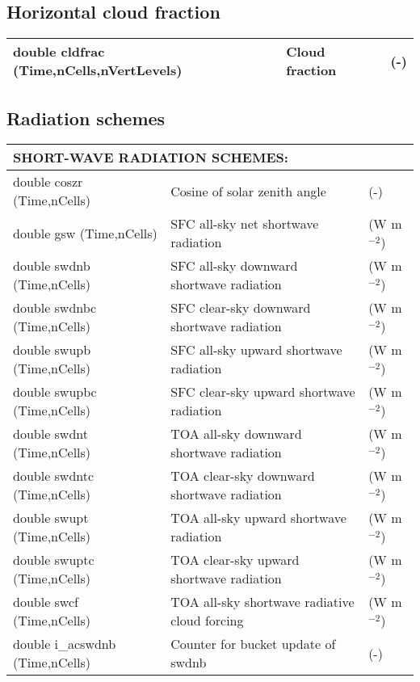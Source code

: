 \subsection{Horizontal cloud fraction}

{\small
\begin{longtable}{|p{2.0in}|p{3.0in}|p{1.0in}|}
\hline
double cldfrac \hfil\break (Time,nCells,nVertLevels) & Cloud fraction & (-)\\ \hline
\end{longtable}
}

\subsection{Radiation schemes}

{\small
\begin{longtable}{|p{2.0in} |p{3.0in} |p{1.0in} |}
\hline
\multicolumn{3}{|l|}{{\rule[-3mm]{0mm}{8mm}\bf SHORT-WAVE RADIATION SCHEMES:} \hfill}\\ \hline
double coszr  (Time,nCells) & Cosine of solar zenith angle & (-) \\ \hline
double gsw (Time,nCells) & SFC all-sky net shortwave radiation & (W m$^{-2}$) \\ \hline
double swdnb (Time,nCells) & SFC all-sky downward shortwave radiation & (W m$^{-2}$) \\ \hline
double swdnbc (Time,nCells) & SFC clear-sky downward shortwave radiation & (W m$^{-2}$) \\ \hline
double swupb (Time,nCells) & SFC all-sky upward shortwave radiation & (W m$^{-2}$) \\ \hline
double swupbc (Time,nCells) & SFC clear-sky upward shortwave radiation & (W m$^{-2}$) \\ \hline
double swdnt (Time,nCells) & TOA all-sky downward shortwave radiation & (W m$^{-2}$) \\ \hline
double swdntc (Time,nCells) & TOA clear-sky downward shortwave radiation & (W m$^{-2}$) \\ \hline
double swupt (Time,nCells) & TOA all-sky upward shortwave radiation & (W m$^{-2}$) \\ \hline
double swuptc (Time,nCells) & TOA clear-sky upward shortwave radiation & (W m$^{-2}$) \\ \hline
double swcf (Time,nCells) & TOA all-sky shortwave radiative cloud forcing & (W m$^{-2}$) \\ \hline
double i\_acswdnb (Time,nCells) & Counter for bucket update of swdnb & (-) \\ \hline

\end{longtable}}
